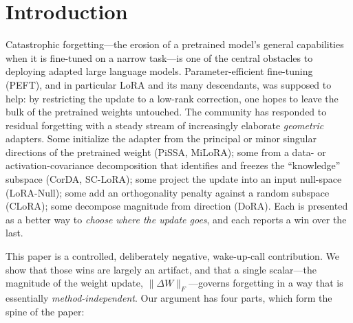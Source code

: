 \documentclass[11pt]{article}
\newcommand{\dw}{\lVert\Delta W\rVert_F}
\begin{document}
\section{Introduction}\label{sec:intro}
Catastrophic forgetting---the erosion of a pretrained model's general capabilities when
it is fine-tuned on a narrow task---is one of the central obstacles to deploying
adapted large language models. Parameter-efficient fine-tuning (PEFT), and in
particular LoRA and its many descendants, was supposed to help: by restricting the
update to a low-rank correction, one hopes to leave the bulk of the pretrained weights
untouched. The community has responded to residual forgetting with a steady stream of
increasingly elaborate \emph{geometric} adapters. Some initialize the adapter from the
principal or minor singular directions of the pretrained weight
(PiSSA, MiLoRA); some from a data- or activation-covariance decomposition that
identifies and freezes the ``knowledge'' subspace (CorDA, SC-LoRA); some project the
update into an input null-space (LoRA-Null); some add an orthogonality penalty against a
random subspace (CLoRA); some decompose magnitude from direction (DoRA). Each is
presented as a better way to \emph{choose where the update goes}, and each reports a win
over the last.

This paper is a controlled, deliberately negative, wake-up-call contribution. We show
that those wins are largely an artifact, and that a single scalar---the magnitude of the
weight update, $\dw$---governs forgetting in a way that is essentially
\emph{method-independent}. Our argument has four parts, which form the spine of the paper:
\end{document}
